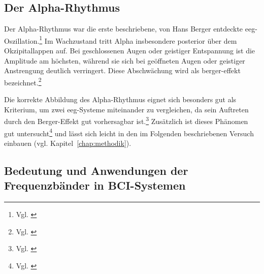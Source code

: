 \subsection{Der Alpha-Rhythmus}
\label{sec:alpha}

Der Alpha-Rhythmus war die erste beschriebene, von Hans Berger entdeckte \acrshort{eeg}-Oszillation.\footnote{Vgl. \cite[S.~1]{jensen2010}} Im Wachzustand tritt Alpha insbesondere posterior über dem Okzipitallappen auf. Bei geschlossenen Augen oder geistiger Entspannung ist die Amplitude am höchsten, während sie sich bei geöffneten Augen oder geistiger Anstrengung deutlich verringert. Diese Abschwächung wird als \gls{berger-effekt} bezeichnet.\footnote{Vgl. \cite{nayak_waveforms}}

Die korrekte Abbildung des Alpha-Rhythmus eignet sich besonders gut als Kriterium, um zwei \acrshort{eeg}-Systeme miteinander zu vergleichen, da sein Auftreten durch den Berger-Effekt gut vorhersagbar ist.\footnote{Vgl. \cite{nayak_waveforms}} Zusätzlich ist dieses Phänomen gut untersucht\footnote{Vgl. \cite[S.~2765--2773]{barry2007}} und lässt sich leicht in den im Folgenden beschriebenen Versuch einbauen (vgl. Kapitel~\ref{chap:methodik}).

\subsection{Bedeutung und Anwendungen der Frequenzbänder in BCI-Systemen}
\label{sec:bcibaender}

